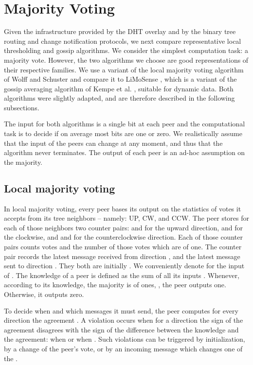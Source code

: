 \documentclass[12pt,english,journal]{elsarticle}
\numberwithin{equation}{section}
\numberwithin{figure}{section}
\theoremstyle{plain}
\theoremstyle{plain}
\begin{document}
\section{\label{sec:Majority-voting}Majority Voting }

Given the infrastructure provided by the DHT overlay and by the binary
tree routing and change notification protocols, we next compare representative
local thresholding and gossip algorithms. We consider the simplest
computation task: a majority vote. However, the two algorithms we
choose are good representations of their respective families. We use
a variant of the local majority voting algorithm of Wolff and Schuster
\citep{MajorityRulej} and compare it to LiMoSense \citep{dynamicGossip},
which is a variant of the gossip averaging algorithm of Kempe et al.
\citep{KempeGossip}, suitable for dynamic data. Both algorithms were
slightly adapted, and are therefore described in the following subsections. 

The input for both algorithms is a single bit 
at each peer  and the computational task is to decide if on
average most bits are one or zero. We realistically assume that the
input of the peers can change at any moment, and thus that the algorithm
never terminates. The output of each peer is an ad-hoc assumption
on the majority.


\subsection{Local majority voting}

In local majority voting, every peer bases its output on the statistics
of votes it accepts from its tree neighbors -- namely: UP, CW, and
CCW. The peer stores for each of those neighbors two counter pairs:
 and  for the upward direction, 
and  for the clockwise, and  and 
for the counterclockwise direction. Each of those counter pairs counts
votes and the number of those votes which are of one. The counter
pair  records the latest message received from direction
, and  the latest message sent to direction . They
both are initially . We conveniently denote 
for the input of . The knowledge of a peer is defined as the
sum of all its inputs .
Whenever, according to its knowledge, the majority is of ones, ,
the peer outputs one. Otherwise, it outputs zero.

To decide when and which messages it must send, the peer computes
for every direction  the agreement
. A violation occurs when for
a direction  the sign of the agreement
disagrees with the sign of the difference between the knowledge and
the agreement: 
when 
or  when .
Such violations can be triggered by initialization, by a change of
the peer's vote, or by an incoming message which changes one of the
. 
\end{document}
